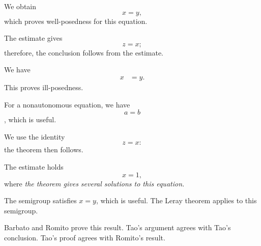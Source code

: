 \documentclass{article}
\begin{document}
We obtain
\[
  x = y,
\]
which proves well-posedness for this equation.

The estimate gives
\begin{equation}
  z = x;
\end{equation}
therefore, the conclusion follows from the estimate.

We have
\begin{align}
  x &= y.
\end{align}
This proves ill-posedness.

For a nonautonomous equation, we have
$$
  a = b
$$,
which is useful.

We use the identity
\[
  z = x:
\]
the theorem then follows.

The estimate holds
\[x=1,\]
where
    \emph{the theorem gives several solutions to this equation.}

The semigroup satisfies $x = y$, which is useful.
The Leray theorem applies to this semigroup.

Barbato and Romito prove this result.
Tao's argument agrees with Tao's conclusion.
Tao’s proof agrees with Romito’s result.
\end{document}
